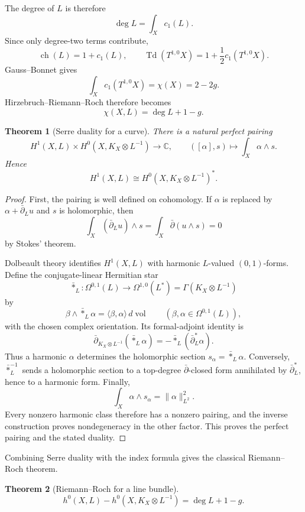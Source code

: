 \documentclass[11pt,oneside,reqno]{book}
\newcommand{\C}{\mathbb C}
\theoremstyle{plain}
\newtheorem{theorem}{Theorem}[chapter]
\theoremstyle{definition}
\theoremstyle{remark}
\begin{document}
The degree of \(L\) is therefore
\[
 \deg L=\int_Xc_1(L).
\]
Since only degree-two terms contribute,
\[
 \operatorname{ch}(L)=1+c_1(L),
 \qquad
 \operatorname{Td}(T^{1,0}X)
 =
 1+\frac12c_1(T^{1,0}X).
\]
Gauss--Bonnet gives
\[
 \int_Xc_1(T^{1,0}X)=\chi(X)=2-2g.
\]
Hirzebruch--Riemann--Roch therefore becomes
\[
 \chi(X,L)=\deg L+1-g.
\]

\begin{theorem}[Serre duality for a curve]
There is a natural perfect pairing
\[
 H^1(X,L)\times H^0(X,K_X\otimes L^{-1})
 \longrightarrow\C,
 \qquad
 ([\alpha],s)\longmapsto\int_X\alpha\wedge s.
\]
Hence
\[
 H^1(X,L)\cong H^0(X,K_X\otimes L^{-1})^*.
\]
\end{theorem}

\begin{proof}
First, the pairing is well defined on cohomology. If
\(\alpha\) is replaced by \(\alpha+\bar\partial_Lu\) and \(s\) is
holomorphic, then
\[
 \int_X(\bar\partial_Lu)\wedge s
 =\int_X\bar\partial(u\wedge s)=0
\]
by Stokes' theorem.

Dolbeault theory identifies \(H^1(X,L)\) with harmonic \(L\)-valued
\((0,1)\)-forms. Define the conjugate-linear Hermitian star
\[
 \bar *_{L}:\Omega^{0,1}(L)
 \longrightarrow\Omega^{1,0}(L^*)
 =\Gamma(K_X\otimes L^{-1})
\]
by
\[
 \beta\wedge\bar *_{L}\alpha
 =\langle\beta,\alpha\rangle\,d\operatorname{vol}
 \qquad(\beta,\alpha\in\Omega^{0,1}(L)),
\]
with the chosen complex orientation. Its formal-adjoint identity is
\[
 \bar\partial_{K_X\otimes L^{-1}}(\bar *_{L}\alpha)
 =-\bar *_{L}(\bar\partial_L^*\alpha).
\]
Thus a harmonic \(\alpha\) determines the holomorphic section
\(s_\alpha=\bar *_{L}\alpha\). Conversely,
\(\bar *_{L}^{-1}\) sends a holomorphic section to a top-degree
\(\bar\partial\)-closed form annihilated by \(\bar\partial_L^*\), hence to
a harmonic form. Finally,
\[
 \int_X\alpha\wedge s_\alpha=\lVert\alpha\rVert_{L^2}^2.
\]
Every nonzero harmonic class therefore has a nonzero pairing, and the
inverse construction proves nondegeneracy in the other factor. This proves
the perfect pairing and the stated duality.
\end{proof}

Combining Serre duality with the index formula gives the classical
Riemann--Roch theorem.

\begin{theorem}[Riemann--Roch for a line bundle]
\[
 \boxed{
 h^0(X,L)-h^0(X,K_X\otimes L^{-1})
 =
 \deg L+1-g.
 }
\]
\end{theorem}
\end{document}
